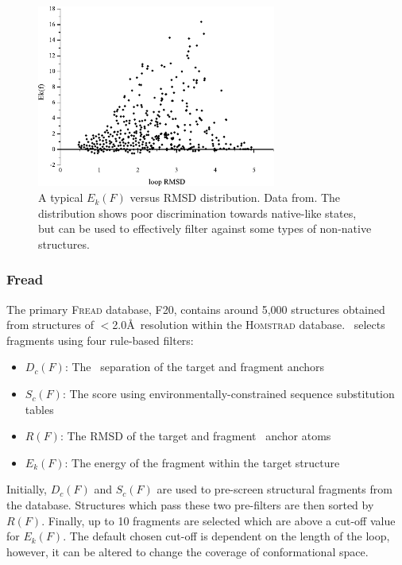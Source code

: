 \begin{figure}[hp]
\begin{center}
\includegraphics[width=0.7\textwidth]{./08-MethodComparison/petra/ek_vs_rmsd.pdf}
\caption[Typical $E_k(F)$ versus RMSD distribution.]{A typical $E_k(F)$ versus RMSD distribution. Data from\cite{METHOD:Petra}. The distribution shows poor discrimination towards native-like states, but can be used to effectively filter against some types of non-native structures.}
\label{fig:methcomp:petraekdist}
\end{center}
\end{figure}

\subsubsection{Fread}
The primary \textsc{Fread} database, F20\cite{METHOD:FREAD:F20}, contains around 5,000 structures obtained from structures of $<$2.0\AA\ resolution within the \textsc{Homstrad} database\cite{SEQUENCE:HOMSTRAD}. \fread\ selects fragments using four rule-based filters:

\begin{itemize} \isep
\item 
$D_c(F)$: The \ca\ separation of the target and fragment anchors
\item
$S_c(F)$: The score using environmentally-constrained sequence substitution tables
\item
$R(F)$: The RMSD of the target and fragment \mainchain\ anchor atoms
\item
$E_k(F)$: The energy of the fragment within the target structure
\end{itemize}

Initially, $D_c(F)$ and $S_c(F)$ are used to pre-screen structural fragments from the database. Structures which pass these two pre-filters are then sorted
by $R(F)$. Finally, up to 10 fragments are selected which are above a cut-off
value for $E_k(F)$. The default chosen cut-off is dependent on the length of the loop, however, it can be altered to change the coverage of conformational
space.


